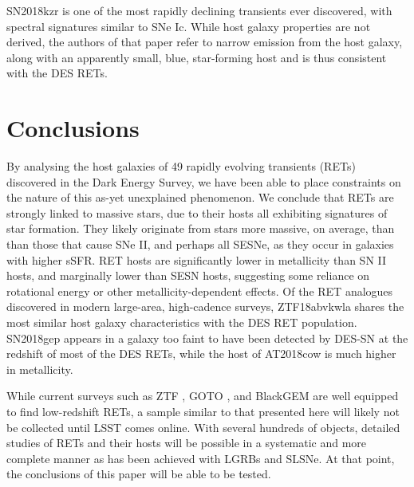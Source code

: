 \documentclass[fleqn,usenatbib,]{mnras}
\newcommand{\replychris}[1]{\color{magenta}#1 \color{black}}
\begin{document}
SN2018kzr \citep{McBrien2019} is one of the most rapidly declining transients ever discovered, with spectral signatures similar to SNe Ic. While host galaxy properties are not derived, the authors of that paper refer to narrow emission from the host galaxy, along with an apparently small, blue, star-forming host and is thus consistent with the DES RETs.


\section{Conclusions}
\label{sec:conc}
By analysing the host galaxies of 49 rapidly evolving transients (RETs) discovered in the Dark Energy Survey, we have been able to place constraints on the nature of this as-yet unexplained phenomenon. We conclude that RETs are strongly linked to massive stars, due to their hosts all exhibiting signatures of star formation. They likely originate from stars more massive, on average, than than those that cause SNe II, and perhaps all SESNe, as they occur in galaxies with higher sSFR. RET hosts are significantly lower in metallicity than SN II hosts, and marginally lower than SESN hosts, suggesting some reliance on rotational energy or other metallicity-dependent effects.
Of the RET analogues discovered in modern large-area, high-cadence surveys, ZTF18abvkwla shares the most similar host galaxy characteristics with the DES RET population. SN2018gep appears in a galaxy too faint to have been detected by DES-SN at the redshift of most of the DES RETs, while the host of AT2018cow is much higher in metallicity.

\replychris{While current surveys such as ZTF \citep{Bellm2019}, GOTO \citep{Dyer2018}, and BlackGEM \citep{Bloemen2016} are well equipped to find low-redshift RETs, a sample similar to that presented here will likely not be collected until LSST comes online. With several hundreds of objects, detailed studies of RETs and their hosts will be possible in a systematic and more complete manner as has been achieved with LGRBs and SLSNe. At that point, the conclusions of this paper will be able to be tested.}
\end{document}

